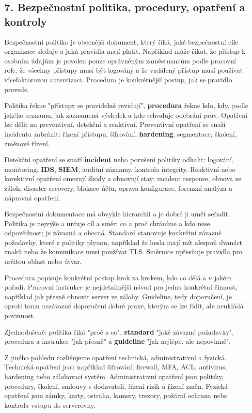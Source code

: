 \subsection*{7. Bezpečnostní politika, procedury, opatření a kontroly}

Bezpečnostní politika je obecnější dokument, který říká, jaké bezpečnostní cíle organizace sleduje a jaká pravidla mají platit. Například může říkat, že přístup k osobním údajům je povolen pouze oprávněným zaměstnancům podle pracovní role, že všechny přístupy musí být logovány a že vzdálený přístup musí používat vícefaktorovou autentizaci. Procedura je konkrétnější postup, jak se pravidlo provede.

Politika řekne "přístupy se pravidelně revidují", \textbf{procedura} řekne kdo, kdy, podle jakého seznamu, jak zaznamená výsledek a kdo schvaluje odebrání práv. Opatření lze dělit na preventivní, detekční a reaktivní. Preventivní opatření se snaží incidentu zabránit: řízení přístupu, šifrování, \textbf{hardening}, segmentace, školení, změnové řízení.

Detekční opatření se snaží \textbf{incident} nebo porušení politiky odhalit: logování, monitoring, \textbf{IDS}, \textbf{SIEM}, auditní záznamy, kontrola integrity. Reaktivní nebo korektivní opatření omezují škody a obnovují stav: incident response, obnova ze záloh, disaster recovery, blokace účtu, oprava konfigurace, forenzní analýza a nápravná opatření.

Bezpečnostní dokumentace má obvykle hierarchii a je dobré ji umět seřadit. Politika je nejvýše a určuje cíl a směr: co a proč chráníme a kdo nese odpovědnost; je závazná a obecná. Standard stanovuje konkrétní závazné požadavky, které z politiky plynou, například že hesla mají mít alespoň dvanáct znaků nebo že komunikace musí používat TLS. Směrnice upřesňuje pravidla pro určitou oblast nebo útvar.

Procedura popisuje konkrétní postup krok za krokem, kdo co dělá a v jakém pořadí. Pracovní instrukce je nejdetailnější návod pro jednu konkrétní činnost, například jak přesně obnovit server ze zálohy. Guideline, tedy doporučení, je oproti tomu nezávazné doporučení dobré praxe, kterým se lze řídit, ale neukládá povinnost.

Zjednodušeně: politika říká "proč a co", \textbf{standard} "jaké závazné požadavky", procedura a instrukce "jak přesně" a \textbf{guideline} "jak nejlépe, ale nepovinně".

Z jiného pohledu rozlišujeme opatření technická, administrativní a fyzická. Technická opatření jsou například šifrování, firewall, MFA, ACL, antivirus, hardening nebo zálohovací systém. Administrativní opatření jsou politiky, procedury, školení, smlouvy s dodavateli, řízení rizik a řízení změn. Fyzická opatření jsou zámky, karty, ostraha, kamery, trezory, požární ochrana nebo kontrola vstupu do serverovny.

